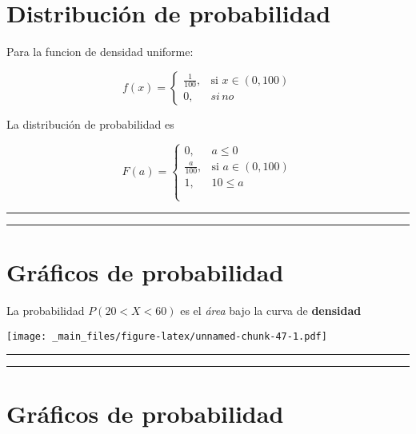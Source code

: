 \documentclass[
]{book}
\begin{document}
\hypertarget{distribuciuxf3n-de-probabilidad-4}{%
\section{Distribución de probabilidad}\label{distribuciuxf3n-de-probabilidad-4}}

Para la funcion de densidad uniforme:

\[
    f(x)= 
\begin{cases}
    \frac{1}{100},& \text{si } x\in (0,100)\\
    0,& si \,no 
\end{cases}
\]

La distribución de probabilidad es

\[
    F(a)= 
\begin{cases}
    0,& a \leq 0 \\
    \frac{a}{100},& \text{si } a\in (0,100)\\
    1, & 10 \leq a \\
    \\
\end{cases}
\]

\begin{center}\rule{0.5\linewidth}{0.5pt}\end{center}

\begin{center}\rule{0.5\linewidth}{0.5pt}\end{center}

\hypertarget{gruxe1ficos-de-probabilidad}{%
\section{Gráficos de probabilidad}\label{gruxe1ficos-de-probabilidad}}

La probabilidad \(P(20<X<60)\) es el \emph{área} bajo la curva de \textbf{densidad}

\texttt{[image: \_main\_files/figure-latex/unnamed-chunk-47-1.pdf]}

\begin{center}\rule{0.5\linewidth}{0.5pt}\end{center}

\begin{center}\rule{0.5\linewidth}{0.5pt}\end{center}

\hypertarget{gruxe1ficos-de-probabilidad-1}{%
\section{Gráficos de probabilidad}\label{gruxe1ficos-de-probabilidad-1}}
\end{document}
